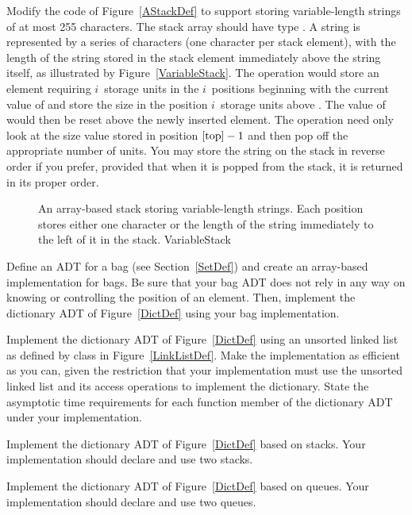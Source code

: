 \begin{projects}
\item
{}
Modify the code of Figure~\ref{AStackDef} to support storing
variable-length strings of at most 255 characters.
The stack array should have type .
A string is represented by a series of characters (one character per
stack element), with the length of the string stored in the stack
element immediately above the string itself, as illustrated
by Figure~\ref{VariableStack}.
The  operation would store an element
requiring $i$~storage units in the $i$~positions beginning with the
current value of 
and store the size in the position $i$~storage units above .
The value of  would then be reset above the newly inserted
element.
The  operation need only look at the size
value stored in position $\Cref{top} - 1$ and then pop off the
appropriate number of units.
You may store the string on the stack in reverse order if you prefer,
provided that when it is popped from the stack, it is returned in its
proper order.

\begin{figure}
\vspace{-\medskipamount}

{An array-based stack storing variable-length strings.
Each position stores either one character or the length of the string
immediately to the left of it in the stack.}
{VariableStack}
\bigskip
\end{figure}

\item
\label{BagADTExer}
Define an ADT for a bag (see Section~\ref{SetDef}) and create an
array-based implementation for bags.
Be sure that your bag ADT does not rely in any way on knowing or
controlling the position of an element.
Then, implement the dictionary ADT of Figure~\ref{DictDef} using
your bag implementation.

\item
Implement the dictionary ADT of Figure~\ref{DictDef} using an unsorted 
linked list as defined by class  in
Figure~\ref{LinkListDef}.
Make the implementation as efficient as you can, given the restriction 
that your implementation must use the unsorted linked list and its access
operations to implement the dictionary.
State the asymptotic time requirements for each function member of the 
dictionary ADT under your implementation.

\item
Implement the dictionary ADT of Figure~\ref{DictDef} based on stacks.
Your implementation should declare and use two stacks.

\item
Implement the dictionary ADT of Figure~\ref{DictDef} based on queues.
Your implementation should declare and use two queues.

\end{projects}
